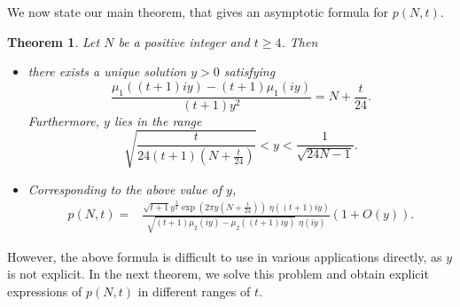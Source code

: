 \documentclass[11pt]{amsart}
\theoremstyle{plain}
\newtheorem{theorem}{Theorem}[section]
\numberwithin{equation}{section}
\begin{document}
	We now state our main theorem, that gives an asymptotic formula for $p(N,t)$.
	
	\begin{theorem}\label{theorem-1.1}
		Let $N$ be a positive integer and $t \ge 4$. Then
		\begin{itemize}
			\item[\hypertarget{thm1.1i}{($i$)}] there exists a unique solution $y > 0$ satisfying
			\begin{equation}\label{eq-(1.3)}
				\frac{\mu_{1}((t+1)iy) - (t+1)\mu_{1}(iy)}{(t+1)y^{2}} = N + \frac{t}{24}. 
			\end{equation}
			Furthermore, $y$ lies in the range
			\begin{equation}\label{eq-(1.4)}
				\sqrt{\frac{t}{24(t+1)\left(N + \frac{t}{24}\right)}} < y < \frac{1}{\sqrt{24N - 1}}.
			\end{equation}
			\item[\hypertarget{thm1.1ii}{$(ii)$}] Corresponding to the above value of $y$,
				\begin{align*}%
					p(N, t) =& \frac{\sqrt{t+1} y^{\frac{3}{2}}\exp\left(2\pi y\left(N + \frac{t}{24}\right)\right)\; \eta((t+1)iy)}{\sqrt{(t+1)\mu_{2}(iy) - \mu_{2}((t+1)iy)}\,\,\eta(iy)}\left(1+O(y)\right). 
				\end{align*} 
		\end{itemize}
	\end{theorem}
	However, the above formula is difficult to use in various applications directly, as $y$ is not explicit. In the next theorem, we solve this problem and obtain explicit expressions of $p(N,t)$ in different ranges of $t$.
\end{document}
